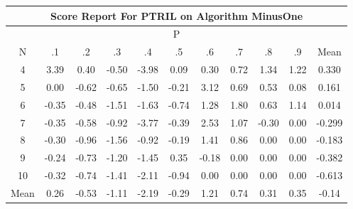 \documentclass[11pt,a4paper]{report}
\begin{document}
\begin{longtable}{ | c || c | c | c | c | c | c | c | c | c || c |}
\hline
\multicolumn{11}{|c|}{ Score Report For PTRIL on Algorithm MinusOne} \\
\hline
\multicolumn{11}{|c|}{ P } \\
\hline
N & .1 & .2 & .3 & .4 & .5 & .6 & .7 & .8 & .9 & Mean\\
 \hline
 \hline
 \endhead
  4 &  \cellcolor[HTML]{A7A7FF} 3.39 &  \cellcolor[HTML]{F7F7FF} 0.40 &  \cellcolor[HTML]{FFEFEF} -0.50 &  \cellcolor[HTML]{FF9797} -3.98 &  \cellcolor[HTML]{FFFFFF} 0.09 &  \cellcolor[HTML]{F7F7FF} 0.30 &  \cellcolor[HTML]{EFEFFF} 0.72 &  \cellcolor[HTML]{DFDFFF} 1.34 &  \cellcolor[HTML]{DFDFFF} 1.22 & 0.330 \\
  5 &  \cellcolor[HTML]{FFFFFF} 0.00 &  \cellcolor[HTML]{FFEFEF} -0.62 &  \cellcolor[HTML]{FFEFEF} -0.65 &  \cellcolor[HTML]{FFD7D7} -1.50 &  \cellcolor[HTML]{FFF7F7} -0.21 &  \cellcolor[HTML]{AFAFFF} 3.12 &  \cellcolor[HTML]{EFEFFF} 0.69 &  \cellcolor[HTML]{EFEFFF} 0.53 &  \cellcolor[HTML]{FFFFFF} 0.08 & 0.161 \\
  6 &  \cellcolor[HTML]{FFF7F7} -0.35 &  \cellcolor[HTML]{FFEFEF} -0.48 &  \cellcolor[HTML]{FFD7D7} -1.51 &  \cellcolor[HTML]{FFD7D7} -1.63 &  \cellcolor[HTML]{FFEFEF} -0.74 &  \cellcolor[HTML]{DFDFFF} 1.28 &  \cellcolor[HTML]{CFCFFF} 1.80 &  \cellcolor[HTML]{EFEFFF} 0.63 &  \cellcolor[HTML]{DFDFFF} 1.14 & 0.014 \\
  7 &  \cellcolor[HTML]{FFF7F7} -0.35 &  \cellcolor[HTML]{FFEFEF} -0.58 &  \cellcolor[HTML]{FFE7E7} -0.92 &  \cellcolor[HTML]{FF9F9F} -3.77 &  \cellcolor[HTML]{FFF7F7} -0.39 &  \cellcolor[HTML]{BFBFFF} 2.53 &  \cellcolor[HTML]{E7E7FF} 1.07 &  \cellcolor[HTML]{FFF7F7} -0.30 &  \cellcolor[HTML]{FFFFFF} 0.00 & -0.299 \\
  8 &  \cellcolor[HTML]{FFF7F7} -0.30 &  \cellcolor[HTML]{FFE7E7} -0.96 &  \cellcolor[HTML]{FFD7D7} -1.56 &  \cellcolor[HTML]{FFE7E7} -0.92 &  \cellcolor[HTML]{FFF7F7} -0.19 &  \cellcolor[HTML]{DFDFFF} 1.41 &  \cellcolor[HTML]{E7E7FF} 0.86 &  \cellcolor[HTML]{FFFFFF} 0.00 &  \cellcolor[HTML]{FFFFFF} 0.00 & -0.183 \\
  9 &  \cellcolor[HTML]{FFF7F7} -0.24 &  \cellcolor[HTML]{FFEFEF} -0.73 &  \cellcolor[HTML]{FFDFDF} -1.20 &  \cellcolor[HTML]{FFD7D7} -1.45 &  \cellcolor[HTML]{F7F7FF} 0.35 &  \cellcolor[HTML]{FFF7F7} -0.18 &  \cellcolor[HTML]{FFFFFF} 0.00 &  \cellcolor[HTML]{FFFFFF} 0.00 &  \cellcolor[HTML]{FFFFFF} 0.00 & -0.382 \\
  10 &  \cellcolor[HTML]{FFF7F7} -0.32 &  \cellcolor[HTML]{FFEFEF} -0.74 &  \cellcolor[HTML]{FFDFDF} -1.41 &  \cellcolor[HTML]{FFC7C7} -2.11 &  \cellcolor[HTML]{FFE7E7} -0.94 &  \cellcolor[HTML]{FFFFFF} 0.00 &  \cellcolor[HTML]{FFFFFF} 0.00 &  \cellcolor[HTML]{FFFFFF} 0.00 &  \cellcolor[HTML]{FFFFFF} 0.00 & -0.613 \\
 \hline
 \hline
Mean &  \cellcolor[HTML]{F7F7FF} 0.26 &  \cellcolor[HTML]{FFEFEF} -0.53 &  \cellcolor[HTML]{FFE7E7} -1.11 &  \cellcolor[HTML]{FFC7C7} -2.19 &  \cellcolor[HTML]{FFF7F7} -0.29 &  \cellcolor[HTML]{DFDFFF} 1.21 &  \cellcolor[HTML]{EFEFFF} 0.74 &  \cellcolor[HTML]{F7F7FF} 0.31 &  \cellcolor[HTML]{F7F7FF} 0.35 &  \cellcolor[HTML]{FFFFFF} -0.14
\end{longtable}
\end{document}
